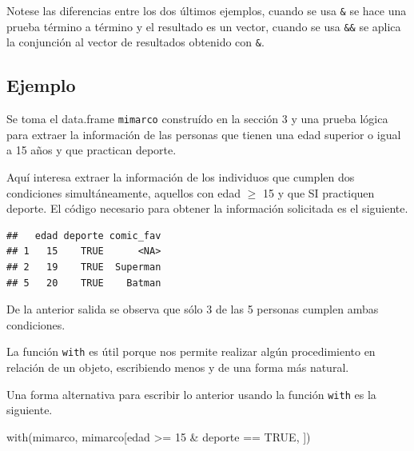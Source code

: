 \documentclass[
]{book}
\makeatletter
\newenvironment{Shaded}{\begin{snugshade}}{\end{snugshade}}
\newcommand{\ConstantTok}[1]{\textcolor[rgb]{0.00,0.00,0.00}{#1}}
\newcommand{\DecValTok}[1]{\textcolor[rgb]{0.00,0.00,0.81}{#1}}
\newcommand{\FunctionTok}[1]{\textcolor[rgb]{0.00,0.00,0.00}{#1}}
\newcommand{\NormalTok}[1]{#1}
\newcommand{\SpecialCharTok}[1]{\textcolor[rgb]{0.00,0.00,0.00}{#1}}
\newenvironment{kframe}{%
\medskip{}
\setlength{\fboxsep}{.8em}
 \def\at@end@of@kframe{}%
 \ifinner\ifhmode%
  \def\at@end@of@kframe{\end{minipage}}%
  \begin{minipage}{\columnwidth}%
 \fi\fi%
 \def\FrameCommand##1{\hskip\@totalleftmargin \hskip-\fboxsep
 \colorbox{shadecolor}{##1}\hskip-\fboxsep
     \hskip-\linewidth \hskip-\@totalleftmargin \hskip\columnwidth}%
 \MakeFramed {\advance\hsize-\width
   \@totalleftmargin\z@ \linewidth\hsize
   \@setminipage}}%
 {\par\unskip\endMakeFramed%
 \at@end@of@kframe}
\newenvironment{rmdblock}[1]
  {
  \begin{itemize}
  \renewcommand{\labelitemi}{
    \raisebox{-.7\height}[0pt][0pt]{
      {\setkeys{Gin}{width=3em,keepaspectratio}\texttt{[image: images/\#1]}}
    }
  }
  \setlength{\fboxsep}{1em}
  \begin{kframe}
  \item
  }
  {
  \end{kframe}
  \end{itemize}
  }
\newenvironment{rmdtip}
  {\begin{rmdblock}{tip}}
  {\end{rmdblock}}
\makeatother
\begin{document}
Notese las diferencias entre los dos últimos ejemplos, cuando se usa \texttt{\&} se hace una prueba término a término y el resultado es un vector, cuando se usa \texttt{\&\&} se aplica la conjunción al vector de resultados obtenido con \texttt{\&}.

\hypertarget{ejemplo-8}{%
\subsection*{Ejemplo}\label{ejemplo-8}}

Se toma el data.frame \texttt{mimarco} construído en la sección 3 y una prueba lógica para extraer la información de las personas que tienen una edad superior o igual a 15 años y que practican deporte.

Aquí interesa extraer la información de los individuos que cumplen dos condiciones simultáneamente, aquellos con edad \(\geq\) 15 y que SI practiquen deporte. El código necesario para obtener la información solicitada es el siguiente.

\begin{Shaded}
\end{Shaded}

\begin{verbatim}
##   edad deporte comic_fav
## 1   15    TRUE      <NA>
## 2   19    TRUE  Superman
## 5   20    TRUE    Batman
\end{verbatim}

De la anterior salida se observa que sólo 3 de las 5 personas cumplen ambas condiciones.

\begin{rmdtip}
La función \texttt{with} es útil porque nos permite realizar algún procedimiento en relación de un objeto, escribiendo menos y de una forma más natural.
\end{rmdtip}

Una forma alternativa para escribir lo anterior usando la función \texttt{with} es la siguiente.

\begin{Shaded}
\begin{Highlighting}[]
\FunctionTok{with}\NormalTok{(mimarco, mimarco[edad }\SpecialCharTok{\textgreater{}=} \DecValTok{15} \SpecialCharTok{\&}\NormalTok{ deporte }\SpecialCharTok{==} \ConstantTok{TRUE}\NormalTok{, ])}
\end{Highlighting}
\end{Shaded}
\end{document}
